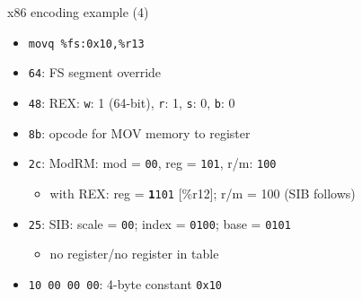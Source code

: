 \begin{frame}[fragile,label=x86ex4]{x86 encoding example (4)}
    \begin{itemize}
    \item \lstinline|movq %fs:0x10,%r13|
    \item {\tt 64}: FS segment override
    \item {\tt 48}: REX: {\tt w}: 1 (64-bit), {\tt r}: \textcolor{orange!80!black}{1}, {\tt s}: \textcolor{blue!80!black}{0}, {\tt b}: \textcolor{green!80!black}{0}
    \item {\tt 8b}: opcode for MOV memory to register
    \item {\tt 2c}: ModRM: mod = {\tt 00}, reg = {\tt 101}, r/m: {\tt 100}
        \begin{itemize}
        \item with REX: reg = {\tt \textbf{\textcolor{orange!80!black}{1}}101} [\%r12]; r/m = {100} (SIB follows)
        \end{itemize}
    \item {\tt 25}: SIB: scale = {\tt 00}; index = {\tt \textcolor{blue!80!black}{0}100}; base = {\tt \textcolor{green!80!black}{0}101}
        \begin{itemize}
        \item no register/no register in table
        \end{itemize}
    \item {\tt 10 00 00 00}: 4-byte constant {\tt 0x10}
    \end{itemize}
\end{frame}

